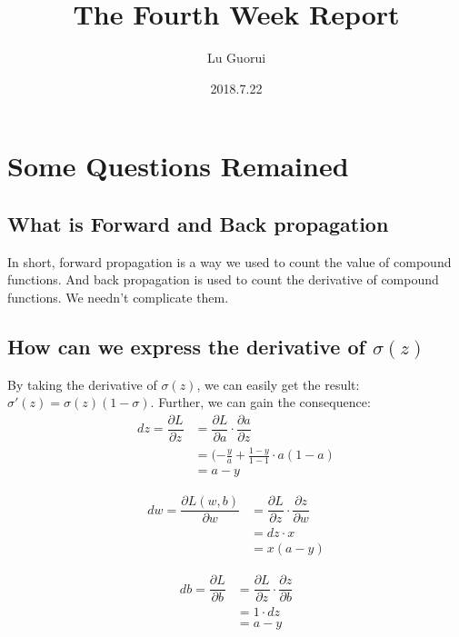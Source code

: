 \documentclass{article}
\title{The Fourth Week Report}
\author{Lu Guorui}
\date{2018.7.22}
\begin{document}
\maketitle
\renewcommand{\contentsname}{Contents}
\tableofcontents
\newpage


\section{Some Questions Remained}

\subsection{What is Forward and Back propagation}
\indent In short, forward propagation is a way we used to count the value of compound functions. And back propagation is used to count the derivative of compound functions. We needn't complicate them.

\subsection{How can we express the derivative of $\sigma(z)$}
\indent By taking the derivative of $\sigma(z)$, we can easily get the result:$\sigma'(z)=\sigma(z)(1-\sigma)$.
\indent Further, we can gain the consequence:
\begin{align}
dz = \dfrac{\partial L}{\partial z} &= \dfrac{\partial L}{\partial a}\cdot\dfrac{\partial a}{\partial z}  \\
&= (-\frac{y}{a}+\frac{1-y}{1-1}\cdot a(1-a) \\
&= a-y
\end{align}

\begin{align}
dw = \dfrac{\partial L(w,b)}{\partial w}&=\dfrac{\partial L}{\partial z}\cdot\dfrac{\partial z}{\partial w} \\
&=dz\cdot x  \\
&=x(a-y) 
\end{align}

\begin{align}
db = \dfrac{\partial L}{\partial b} &=\dfrac{\partial L}{\partial z}\cdot\dfrac{\partial z}{\partial b}  \\
&= 1\cdot dz \\
&= a-y
\end{align}
\end{document}
